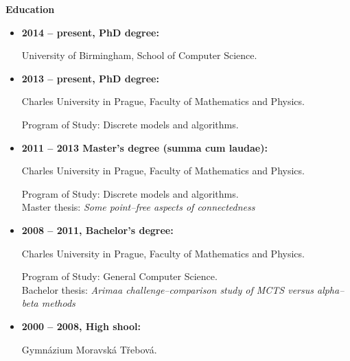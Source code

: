 \documentclass[a4paper, 11pt]{article}
\begin{document}
\textbf{Education}
\vspace{-0.7em}
\begin{itemize}
    \item \textbf{2014 -- present, PhD degree:}

    University of Birmingham, School of Computer Science.

    \item \textbf{2013 -- present, PhD degree:}

    Charles University in Prague, Faculty of Mathematics and Physics.

    Program of Study: Discrete models and algorithms.

    \item \textbf{2011 -- 2013 Master's degree (summa cum laudae):}

    Charles University in Prague, Faculty of Mathematics and Physics.

    Program of Study: Discrete models and algorithms. \\
    Master thesis: \emph{Some point--free aspects of connectedness}

    \item \textbf{2008 -- 2011, Bachelor's degree:}

    Charles University in Prague, Faculty of Mathematics and Physics.

    Program of Study: General Computer Science.\\
    Bachelor thesis: \emph{Arimaa challenge--comparison study of MCTS versus alpha--beta methods}

    \item \textbf{2000 -- 2008, High shool:}

    Gymnázium Moravská Třebová.
\end{itemize}

% 
\end{document}
